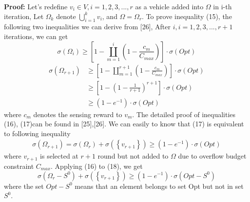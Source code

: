 \documentclass[journal]{IEEEtran}
\begin{document}
\noindent
\textbf{Proof:} Let’s redefine $v_{i}\in V,i=1,2,3,...,r$ as a vehicle added into $\Omega$ in i-th iteration, Let $\Omega_{k}$ denote $ \bigcup_{i=1}^{k}v_{i}$, and $\Omega =\Omega _{r}$. To prove inequality (15), the following two inequalities we can derive from [26], After $i,i=1,2,3,...,r+1$ iterations, we can get
\begin{equation}
\sigma (\Omega _{i})\geqslant \left [ 1-\coprod_{m=1}^{i}(1-\frac{c_{m}}{C_{max}}) \right ]\cdot \sigma (Opt)
\end{equation}
\begin{equation}
\begin{aligned}
\sigma (\Omega _{r+1})&\geqslant \left [ 1-\coprod_{m=1}^{r+1}(1-\frac{c_{m}}{C_{max}}) \right ]\cdot \sigma (Opt) \\ & \geqslant \left [ 1-\left ( 1-\frac{1}{r+1} \right )^{r+1} \right ]\cdot\sigma (Opt)\\&\geqslant \left (1-e^{-1}  \right )\cdot\sigma (Opt) 
\end{aligned}
\end{equation}
where $c_{m}$ denotes the sensing reward to $v_{m}$. The detailed proof of inequalities (16), (17)can be found in [25],[26]. We can easily to know that (17) is equivalent to following inequality
\begin{equation}
\begin{aligned}
\sigma (\Omega _{r+1})=\sigma(\Omega _{r})+\sigma(\left \{ v_{r+1}\right \})\geqslant\left ( 1-e^{-1} \right ) \cdot \sigma (Opt)
\end{aligned}
\end{equation}
where $v_{r+1}$ is selected at $r+1$ round but not added to $\Omega$ due to overflow budget constraint $C_{max}$. Applying (16) to (18), we get
\begin{equation}
\sigma (\Omega _{r}-S^{0})+\sigma (\left \{ v_{r+1} \right \})\geqslant \left ( 1-e^{-1} \right )\cdot \sigma (Opt-S^{0})
\end{equation}
where the set $Opt-S^{0}$ means that an element belongs to set Opt but not in set $S^{0}$.
\end{document}
